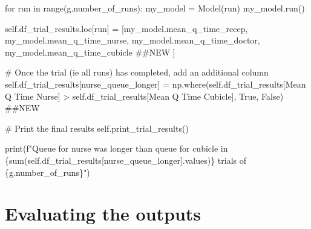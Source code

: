 \documentclass[
  letterpaper,
  DIV=11,
  numbers=noendperiod]{scrreprt}
\newenvironment{Shaded}{\begin{snugshade}}{\end{snugshade}}
\newcommand{\BuiltInTok}[1]{\textcolor[rgb]{0.00,0.23,0.31}{#1}}
\newcommand{\CommentTok}[1]{\textcolor[rgb]{0.37,0.37,0.37}{#1}}
\newcommand{\ControlFlowTok}[1]{\textcolor[rgb]{0.00,0.23,0.31}{#1}}
\newcommand{\KeywordTok}[1]{\textcolor[rgb]{0.00,0.23,0.31}{#1}}
\newcommand{\NormalTok}[1]{\textcolor[rgb]{0.00,0.23,0.31}{#1}}
\newcommand{\OperatorTok}[1]{\textcolor[rgb]{0.37,0.37,0.37}{#1}}
\newcommand{\SpecialCharTok}[1]{\textcolor[rgb]{0.37,0.37,0.37}{#1}}
\newcommand{\SpecialStringTok}[1]{\textcolor[rgb]{0.13,0.47,0.30}{#1}}
\newcommand{\StringTok}[1]{\textcolor[rgb]{0.13,0.47,0.30}{#1}}
\newcommand{\VariableTok}[1]{\textcolor[rgb]{0.07,0.07,0.07}{#1}}
\begin{document}
\begin{Shaded}
\begin{Highlighting}[]
\ControlFlowTok{for}\NormalTok{ run }\KeywordTok{in} \BuiltInTok{range}\NormalTok{(g.number\_of\_runs):}
\NormalTok{    my\_model }\OperatorTok{=}\NormalTok{ Model(run)}
\NormalTok{    my\_model.run()}

    \VariableTok{self}\NormalTok{.df\_trial\_results.loc[run] }\OperatorTok{=}\NormalTok{ [my\_model.mean\_q\_time\_recep,}
\NormalTok{                                      my\_model.mean\_q\_time\_nurse,}
\NormalTok{                                      my\_model.mean\_q\_time\_doctor,}
\NormalTok{                                      my\_model.mean\_q\_time\_cubicle }\CommentTok{\#\#NEW}
\NormalTok{                                      ]}

\CommentTok{\# Once the trial (ie all runs) has completed, add an additional column}
\VariableTok{self}\NormalTok{.df\_trial\_results[}\StringTok{\textquotesingle{}nurse\_queue\_longer\textquotesingle{}}\NormalTok{] }\OperatorTok{=}\NormalTok{ np.where(}\VariableTok{self}\NormalTok{.df\_trial\_results[}\StringTok{\textquotesingle{}Mean Q Time Nurse\textquotesingle{}}\NormalTok{] }\OperatorTok{\textgreater{}} \VariableTok{self}\NormalTok{.df\_trial\_results[}\StringTok{\textquotesingle{}Mean Q Time Cubicle\textquotesingle{}}\NormalTok{], }\VariableTok{True}\NormalTok{, }\VariableTok{False}\NormalTok{) }\CommentTok{\#\#NEW}

\CommentTok{\# Print the final results}
\VariableTok{self}\NormalTok{.print\_trial\_results()}

\BuiltInTok{print}\NormalTok{(}\SpecialStringTok{f"Queue for nurse was longer than queue for cubicle in }\SpecialCharTok{\{}\BuiltInTok{sum}\NormalTok{(}\VariableTok{self}\NormalTok{.df\_trial\_results[}\StringTok{\textquotesingle{}nurse\_queue\_longer\textquotesingle{}}\NormalTok{].values)}\SpecialCharTok{\}}\SpecialStringTok{ trials of }\SpecialCharTok{\{}\NormalTok{g}\SpecialCharTok{.}\NormalTok{number\_of\_runs}\SpecialCharTok{\}}\SpecialStringTok{"}\NormalTok{)}
\end{Highlighting}
\end{Shaded}

\section{Evaluating the outputs}\label{evaluating-the-outputs-8}
\end{document}
